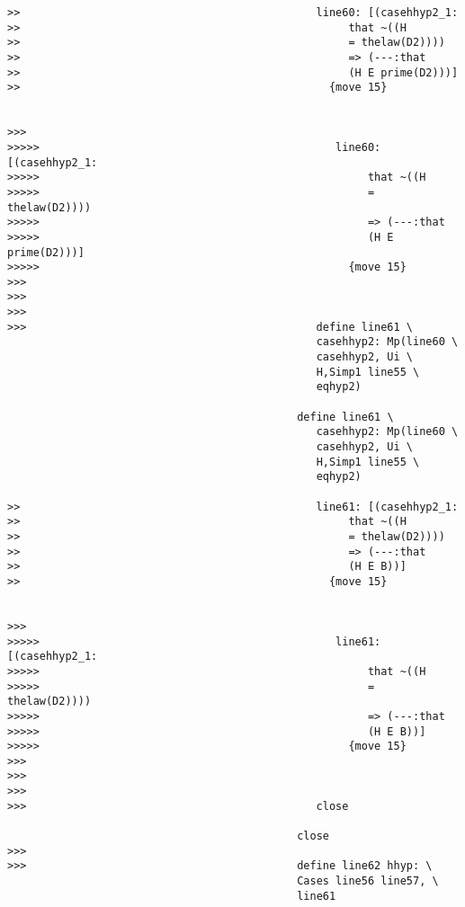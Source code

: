 \documentclass[12pt]{article}
\begin{document}
\begin{verbatim}
>>                                              line60: [(casehhyp2_1:
>>                                                   that ~((H
>>                                                   = thelaw(D2))))
>>                                                   => (---:that
>>                                                   (H E prime(D2)))]
>>                                                {move 15}


>>>
>>>>>                                              line60: [(casehhyp2_1:
>>>>>                                                   that ~((H
>>>>>                                                   = thelaw(D2))))
>>>>>                                                   => (---:that
>>>>>                                                   (H E prime(D2)))]
>>>>>                                                {move 15}
>>>
>>>
>>>
>>>                                             define line61 \
                                                casehhyp2: Mp(line60 \
                                                casehhyp2, Ui \
                                                H,Simp1 line55 \
                                                eqhyp2)

                                             define line61 \
                                                casehhyp2: Mp(line60 \
                                                casehhyp2, Ui \
                                                H,Simp1 line55 \
                                                eqhyp2)

>>                                              line61: [(casehhyp2_1:
>>                                                   that ~((H
>>                                                   = thelaw(D2))))
>>                                                   => (---:that
>>                                                   (H E B))]
>>                                                {move 15}


>>>
>>>>>                                              line61: [(casehhyp2_1:
>>>>>                                                   that ~((H
>>>>>                                                   = thelaw(D2))))
>>>>>                                                   => (---:that
>>>>>                                                   (H E B))]
>>>>>                                                {move 15}
>>>
>>>
>>>
>>>                                             close

                                             close
>>>
>>>                                          define line62 hhyp: \
                                             Cases line56 line57, \
                                             line61


\end{verbatim}
\end{document}
